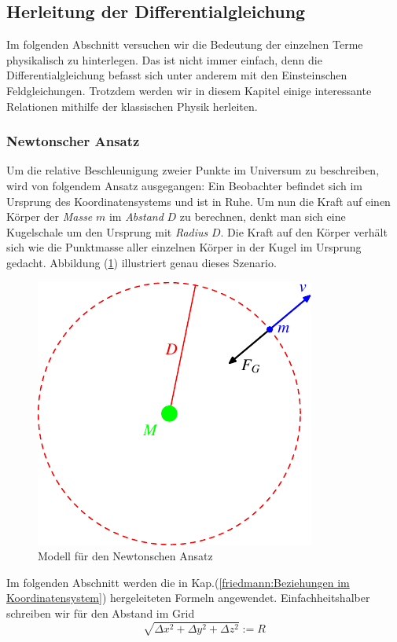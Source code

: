 \begin{refsection}
\subsection{Herleitung der Differentialgleichung}
Im folgenden Abschnitt versuchen wir die Bedeutung der einzelnen Terme physikalisch zu hinterlegen. Das ist nicht immer einfach, denn die Differentialgleichung befasst sich unter anderem mit den Einsteinschen Feldgleichungen. Trotzdem werden wir in diesem Kapitel einige interessante Relationen mithilfe der klassischen Physik herleiten.
\subsubsection{Newtonscher Ansatz}
Um die relative Beschleunigung zweier Punkte im Universum zu beschreiben, wird von folgendem Ansatz ausgegangen: Ein Beobachter befindet sich im Ursprung des Koordinatensystems und ist in Ruhe. Um nun die Kraft auf einen Körper der {\em Masse} $m$ im {\em Abstand} $D$ zu berechnen, denkt man sich eine Kugelschale um den Ursprung mit {\em Radius} $D$. Die Kraft auf den Körper verhält sich wie die Punktmasse aller  einzelnen Körper in der Kugel im Ursprung gedacht. Abbildung (\ref{friedmann:gravitation}) illustriert genau dieses Szenario.
\begin{figure}[h]
	\centering
	\includegraphics{friedmann/images/friedmann-5.pdf}
	\caption{Modell für den Newtonschen Ansatz
	\label{friedmann:gravitation}}
\end{figure}%
Im folgenden Abschnitt werden die in Kap.(\ref{friedmann:Beziehungen im Koordinatensystem}) hergeleiteten Formeln angewendet. Einfachheitshalber schreiben wir für den Abstand im Grid
\[ \sqrt{\Delta x^2 + \Delta y^2 + \Delta z^2} := R \]

\end{refsection}
